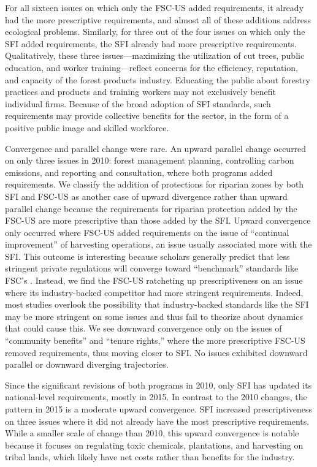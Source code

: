 \documentclass[
      12pt,
            Review ]{article}
\begin{document}
For all sixteen issues on which only the FSC-US added requirements, it
already had the more prescriptive requirements, and almost all of these
additions address ecological problems. Similarly, for three out of the
four issues on which only the SFI added requirements, the SFI already
had more prescriptive requirements. Qualitatively, these three
issues---maximizing the utilization of cut trees, public education, and
worker training---reflect concerns for the efficiency, reputation, and
capacity of the forest products industry. Educating the public about
forestry practices and products and training workers may not exclusively
benefit individual firms. Because of the broad adoption of SFI
standards, such requirements may provide collective benefits for the
sector, in the form of a positive public image and skilled workforce.



Convergence and parallel change were rare. An upward parallel change
occurred on only three issues in 2010: forest management planning,
controlling carbon emissions, and reporting and consultation, where both
programs added requirements. We classify the addition of protections for
riparian zones by both SFI and FSC-US as another case of upward
divergence rather than upward parallel change because the requirements
for riparian protection added by the FSC-US are more prescriptive than
those added by the SFI. Upward convergence only occurred where FSC-US
added requirements on the issue of ``continual improvement'' of
harvesting operations, an issue usually associated more with the SFI.
This outcome is interesting because scholars generally predict that less
stringent private regulations will converge toward ``benchmark''
standards like FSC's \citep{Overdevest2005, Overdevest2010}. Instead, we
find the FSC-US ratcheting up prescriptiveness on an issue where its
industry-backed competitor had more stringent requirements. Indeed, most
studies overlook the possibility that industry-backed standards like the
SFI may be more stringent on some issues and thus fail to theorize about
dynamics that could cause this. We see downward convergence only on the
issues of ``community benefits'' and ``tenure rights,'' where the more
prescriptive FSC-US removed requirements, thus moving closer to SFI. No
issues exhibited downward parallel or downward diverging trajectories.

Since the significant revisions of both programs in 2010, only SFI has
updated its national-level requirements, mostly in 2015. In contrast to
the 2010 changes, the pattern in 2015 is a moderate upward convergence.
SFI increased prescriptiveness on three issues where it did not already
have the most prescriptive requirements. While a smaller scale of change
than 2010, this upward convergence is notable because it focuses on
regulating toxic chemicals, plantations, and harvesting on tribal lands,
which likely have net costs rather than benefits for the industry.
\end{document}
